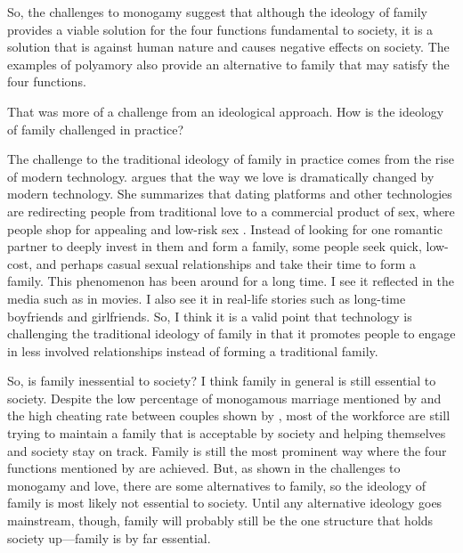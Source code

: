 \documentclass[12pt]{article}
\begin{document}
So, the challenges to monogamy suggest that although the ideology of family
provides a viable solution for the four functions fundamental to society,
it is a solution that is against human nature and
causes negative effects on society.
The examples of polyamory also provide an alternative to family that may
satisfy the four functions.

That was more of a challenge from an ideological approach.
How is the ideology of family challenged in practice?

The challenge to the traditional ideology of family in practice comes from
the rise of modern technology.
\citet{malinowska2022love} argues that the way we love is
dramatically changed by modern technology.
She summarizes that dating platforms and other technologies are redirecting
people from traditional love to a commercial product of sex,
where people shop for appealing and low-risk sex \citep{malinowska2022love}.
Instead of looking for one romantic partner to deeply invest in them and form a
family, some people seek quick, low-cost,
and perhaps casual sexual relationships and take their time to form a family.
This phenomenon has been around for a long time.
I see it reflected in the media such as in movies.
I also see it in real-life stories such as long-time boyfriends and girlfriends.
So, I think it is a valid point that technology is challenging the traditional
ideology of family in that it promotes people to engage in less involved
relationships instead of forming a traditional family.

So, is family inessential to society?
I think family in general is still essential to society.
Despite the low percentage of monogamous marriage mentioned by
\citet[p. 63]{gittins1993family} and the high cheating rate between couples
shown by \citet{fridman2023aella},
most of the workforce are still trying to maintain a family that is acceptable
by society and helping themselves and society stay on track.
Family is still the most prominent way where the four functions mentioned by
\citet[p. 60]{gittins1993family} are achieved.
But, as shown in the challenges to monogamy and love,
there are some alternatives to family,
so the ideology of family is most likely not essential to society.
Until any alternative ideology goes mainstream, though,
family will probably still be the one structure that holds society up—family
is by far essential.
\pagebreak


\end{document}
